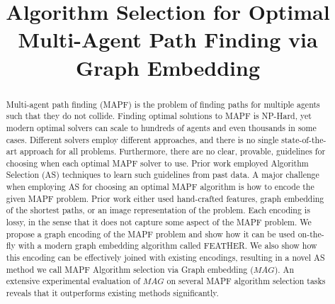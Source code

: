 \documentclass{ecai}
\newcommand{\Carmel}[1]{\textcolor{red}{\textsc{Carmel}: #1}}
\newcommand{\mapfgas}[1]{\ensuremath{\textit{MAG}}\xspace}
\begin{document}
\begin{frontmatter}

\title{Algorithm Selection for Optimal Multi-Agent Path Finding via Graph Embedding}




\begin{abstract}
Multi-agent path finding (MAPF) is the problem of finding paths for multiple agents such that they do not collide. 
Finding optimal solutions to MAPF is NP-Hard, yet modern optimal solvers can scale to hundreds of agents and even thousands in some cases. 
Different solvers employ different approaches, and there is no single state-of-the-art approach for all problems. 
Furthermore, there are no clear, provable, guidelines for choosing when each optimal MAPF solver to use. 
Prior work employed Algorithm Selection (AS) techniques to learn such guidelines from past data. 
A major challenge when employing AS for choosing an optimal MAPF algorithm is how to encode the given MAPF problem. 
Prior work either used hand-crafted features, graph embedding of the shortest paths, or an image representation of the problem. Each encoding is lossy, in the sense that it does not capture some aspect of the MAPF problem. 
We propose a graph encoding of the MAPF problem and show how it can be used on-the-fly with a modern graph embedding algorithm called FEATHER. 
We also show how this encoding can be effectively joined with existing encodings, resulting in a novel AS method we call MAPF Algorithm selection via Graph embedding (\mapfgas\ ). %
An extensive experimental evaluation of \mapfgas\ on several MAPF algorithm selection tasks reveals that it outperforms existing methods significantly. 
\end{abstract}

\end{frontmatter}
\end{document}
